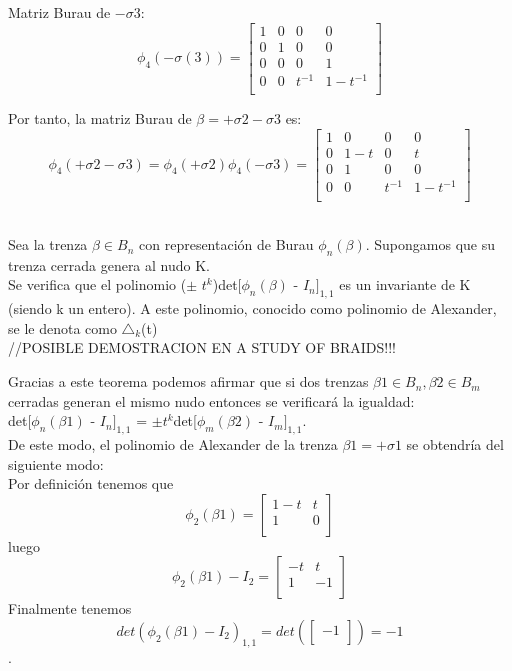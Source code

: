 \documentclass[14pt]{extarticle}
\begin{document}
Matriz Burau de $ -\sigma3 $:
\[ \phi_{4} ( -\sigma (3)) = \begin{bmatrix}
	1 & 0 & 0 & 0 \\
	0 & 1 & 0 & 0 \\
	0 & 0 & 0 & 1  \\	
	0 & 0 & t^{-1} & 1-t^{-1} \\
\end{bmatrix}\]
 
 Por tanto, la matriz Burau de $\beta = +\sigma2-\sigma3$ es:
 \[ \phi_{4} (+\sigma2-\sigma3) = \phi_{4} (+\sigma2) \phi_{4}(-\sigma3) = \begin{bmatrix}
 1 & 0 & 0 & 0 \\
 0 & 1-t & 0 & t \\
 0 & 1 & 0 & 0  \\	
 0 & 0 & t^{-1} & 1-t^{-1} \\
 \end{bmatrix}\]\\
 
 
\begin{teo}
	Sea la trenza $\beta \in B_{n}$ con representación de Burau $\phi_{n}(\beta)$. Supongamos que su trenza cerrada genera al nudo K.\\
	Se verifica que el polinomio ($ \pm $ $ t^{k} $)det[$\phi_{n}(\beta)$ - $ I_{n} $$ ]_{1,1} $ es un invariante de K (siendo k un entero). A este polinomio, conocido como polinomio de Alexander, se le denota como $ \triangle_{k} $(t)\\
	//POSIBLE DEMOSTRACION EN A STUDY OF BRAIDS!!!\\
\end{teo}

Gracias a este teorema podemos afirmar que si dos trenzas $\beta1 \in B_{n}, \beta2 \in B_{m}$ cerradas generan el mismo nudo entonces se verificará la igualdad:\\
det[$\phi_{n}(\beta1)$ - $ I_{n} $$ ]_{1,1}$ = $ \pm t^{k} $det[$\phi_{m}(\beta2)$ - $ I_{m} $$ ]_{1,1}$.\\

De este modo, el polinomio de Alexander de la trenza $\beta1 = +\sigma1$ se obtendría del siguiente modo:\\
Por definición tenemos que  
\[ \phi_{2} (\beta1) = \begin{bmatrix}
1-t & t  \\
1 & 0 \\
\end{bmatrix}\]
luego 
\[ \phi_{2} (\beta1) - I_{2}= \begin{bmatrix}
-t & t  \\
1 & -1 \\
\end{bmatrix}\]
Finalmente tenemos 
\[ det(\phi_{2} (\beta1) - I_{2})_{1,1} = det(\begin{bmatrix}
-1 \\
\end{bmatrix}) = -1\].
\end{document}
